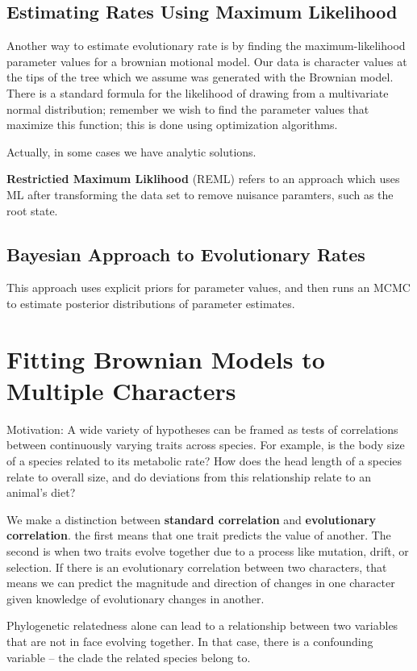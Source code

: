 \documentclass{article}
\newcommand{\1}[1]{\textbf{1}_{\left[#1\right]}} %
\begin{document}
\subsection{Estimating Rates Using Maximum Likelihood}
Another way to estimate evolutionary rate is by finding the maximum-likelihood
parameter values for a brownian motional model. Our data is character values at
the tips of the tree which we assume was generated with the Brownian model.
There is a standard formula for the likelihood of drawing from a multivariate
normal distribution; remember we wish to find the parameter values that maximize
this function; this is done using optimization algorithms.

Actually, in some cases we have analytic solutions.

\textbf{Restrictied Maximum Liklihood} (REML) refers to an approach which uses
ML after transforming the data set to remove nuisance paramters, such as the
root state.


\subsection{Bayesian Approach to Evolutionary Rates}
This approach uses explicit priors for parameter values, and then runs an MCMC
to estimate posterior distributions of parameter estimates.


\section{Fitting Brownian Models to Multiple Characters}
Motivation: A wide variety of hypotheses can be framed as tests of correlations
between continuously varying traits across species. For example, is the body
size of a species related to its metabolic rate? How does the head length of a
species relate to overall size, and do deviations from this relationship relate
to an animal’s diet?


We make a distinction between \textbf{standard correlation} and
\textbf{evolutionary correlation}. the first means that one trait predicts the
value of another. The second is when two traits evolve together due to a process
like mutation, drift, or selection. If there is an evolutionary correlation
between two characters, that means we can predict the magnitude and direction of
changes in one character given knowledge of evolutionary changes in another.

Phylogenetic relatedness alone can lead to a relationship between two variables
that are not in face evolving together. In that case, there is a confounding
variable -- the clade the related species belong to.
\end{document}
